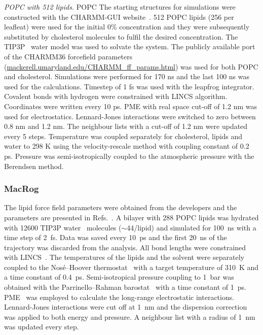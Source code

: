 \documentclass[journal=jacsat,manuscript=article]{achemso}
\begin{document}
{\it POPC with 512 lipids.}
%
POPC The starting structures for simulations were constructed with
the CHARMM-GUI website~\cite{jo08}. 512 POPC lipids (256 per leafleat) were 
used for the initial 0\% concentration and they were subsequently 
substituted by cholesterol molecules to fulfil the desired concentration.
The TIP3P~\cite{jorgensen83} water model was used to solvate the system. 
The publicly available port of the CHARMM36 forcefield parameters (\url{mackerell.umaryland.edu/CHARMM_ff_params.html}) 
was used for both POPC and cholesterol. 
Simulations were performed for 170 ns and the last 100 ns was used for the calculations.
Timestep of 1 fs was used with the leapfrog integrator. Covalent bonds with hydrogen 
were constrained with LINCS algorithm. Coordinates were written every 10 ps.
PME with real space cut-off of 1.2 nm was used for electrostatics. Lennard-Jones 
interactions were switched to zero between 0.8 nm and 1.2 nm. The neighbour lists with a
cut-off of 1.2 nm were updated every 5 steps. Temperature was coupled separately for cholesterol, lipids
and water to 298 K using the velocity-rescale method with coupling constant of 0.2 ps.
Pressure was semi-isotropically coupled to the atmospheric pressure with the Berendsen
method.

\subsubsection{MacRog}
The lipid force field parameters were obtained from the developers and the parameters are presented in Refs.~. 
A bilayer with 288 POPC lipids was hydrated with 12600 TIP3P water~\cite{jorgensen83} molecules ($\sim$44/lipid) and simulated for 100~ns with a time step of 2~fs. Data was saved 
every 10~ps and the first 20~ns of the trajectory was discarded from the analysis. 
All bond lengths were constrained with LINCS~\cite{hess97,hess07}. The temperatures of the lipids and the solvent were separately coupled to the Nos\'{e}--Hoover thermostat~\cite{nose84,hoover85} 
with a target temperature of 310~K and a time constant of 0.4~ps. Semi-isotropical pressure coupling to 1~bar was obtained with the Parrinello--Rahman 
barostat~\cite{parrinello81} with a time constant of 1~ps. PME~\cite{darden93,essman95} was employed to calculate the long-range electrostatic interactions. Lennard-Jones interactions were cut off 
at 1~nm and the dispersion correction was applied to both energy and pressure. A neighbour list with a radius of 1~nm was updated every step. 
\end{document}
